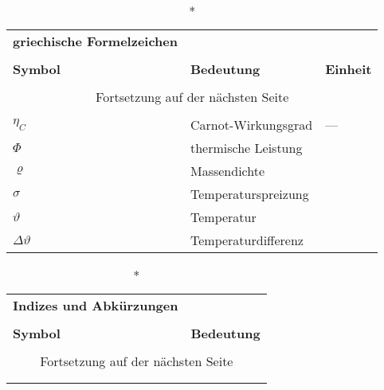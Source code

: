 \begin{onehalfspacing}
\begin{longtable}[h]{p{} p{} p{}}
\end{longtable}

\begin{longtable}[h]{p{} p{} p{}}
		\caption*{\textbf{griechische Formelzeichen}} \\
		\\
		\textbf{Symbol} & \textbf{Bedeutung} & \textbf{Einheit} \\ %
		\endhead
		\\
		\multicolumn{3}{c}{Fortsetzung auf der nächsten Seite} \\
		\endfoot
		\multicolumn{3}{c}{ } \\
		\endlastfoot
		
		$\eta_{C}$ & Carnot-Wirkungsgrad & ---\\
		$\Phi$ & thermische Leistung & \watt\\
		$\varrho$& Massendichte&\kilogrampercubicmetre\\
			$\sigma$&Temperaturspreizung&\kelvin\\
		$\vartheta $ & Temperatur  & \degreecelsius\\
		$\Delta\vartheta $ & Temperaturdifferenz  &\kelvin\\
		
\end{longtable}

\begin{longtable}[h]{p{} p{}}
		\caption*{\textbf{Indizes und Abkürzungen}} \\
		\\
		\textbf{Symbol} & \textbf{Bedeutung} \\ %
		\endhead
		\\
		\multicolumn{2}{c}{Fortsetzung auf der nächsten Seite} \\
		\endfoot
		\multicolumn{2}{c}{ } \\
		\endlastfoot
		

\end{longtable}
\end{onehalfspacing}

